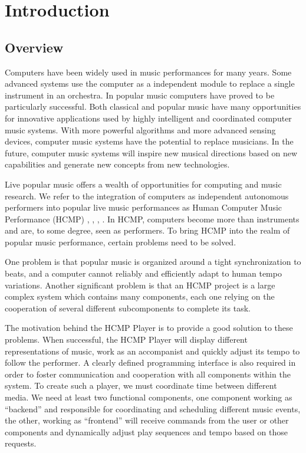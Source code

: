 \chapter{Introduction}

\section{Overview}
Computers have been widely used in music performances for many years. Some
advanced systems use the computer as a independent module to replace a
single instrument in an orchestra. In popular music computers have proved
to be particularly successful. Both classical and popular music have many
opportunities for innovative applications used by highly intelligent and
coordinated computer music systems. With more powerful algorithms and more
advanced sensing devices, computer music systems have the potential to
replace musicians. In the future, computer music systems will inspire new 
musical directions based on new
capabilities and generate new concepts from new technologies.

Live popular music offers a wealth of opportunities for computing and music
research.  We refer to the integration of computers as independent autonomous
performers into popular live music performances as Human Computer Music
Performance (HCMP) \cite{Hcmp0}, \cite{Hcmp1}, \cite{Dannenberga}, \cite{Gold2011}.
In HCMP, computers become more than instruments and are,
to some degree, seen as performers. To bring HCMP into the realm of popular
music performance, certain problems need to be solved. 

One problem is that
popular music is organized around a tight synchronization to beats, and a
computer cannot reliably and efficiently adapt to human tempo variations.
Another significant problem is that an HCMP project is a large complex
system which contains many components, each one relying on the cooperation of several
different subcomponents to complete its task.

The motivation behind the HCMP Player is to provide a good solution to these
problems. When successful, the HCMP Player will display different
representations of music, work as an accompanist and quickly adjust its
tempo to follow the performer. A clearly defined programming interface is
also required in order to foster communication and cooperation with all
components within the system. To create such a player, we must coordinate
time between different media. We need at least two functional components,
one component working as ``backend'' and responsible for coordinating and
scheduling different music events, the other, working as ``frontend'' will
receive commands from the user or other components and dynamically adjust
play sequences and tempo based on those requests.

